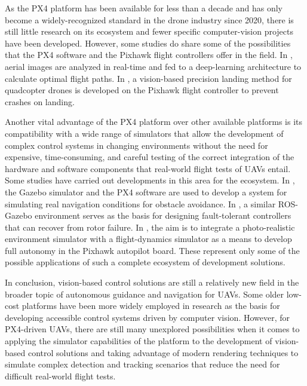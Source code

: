 As the PX4 platform has been available for less than a decade and has only become a widely-recognized standard in the drone industry since 2020, there is still little research on its ecosystem and fewer specific computer-vision projects have been developed.
However, some studies do share some of the possibilities that the PX4 software and the Pixhawk flight controllers offer in the field.
In \cite{sizkouhi2022}, aerial images are analyzed in real-time and fed to a deep-learning architecture to calculate optimal flight paths.
In \cite{naufal2022}, a vision-based precision landing method for quadcopter drones is developed on the Pixhawk flight controller to prevent crashes on landing.

Another vital advantage of the PX4 platform over other available platforms is its compatibility with a wide range of simulators that allow the development of complex control systems in changing environments without the need for expensive, time-consuming, and careful testing of the correct integration of the hardware and software components that real-world flight tests of UAVs entail.
Some studies have carried out developments in this area for the ecosystem.
In \cite{garcia2022}, the Gazebo simulator and the PX4 software are used to develop a system for simulating real navigation conditions for obstacle avoidance.
In \cite{chen2022}, a similar ROS-Gazebo environment serves as the basis for designing fault-tolerant controllers that can recover from rotor failure.
In \cite{huynh2022}, the aim is to integrate a photo-realistic environment simulator with a flight-dynamics simulator as a means to develop full autonomy in the Pixhawk autopilot board.
These represent only some of the possible applications of such a complete ecosystem of development solutions.

In conclusion, vision-based control solutions are still a relatively new field in the broader topic of autonomous guidance and navigation for UAVs.
Some older low-cost platforms have been more widely employed in research as the basis for developing accessible control systems driven by computer vision.
However, for PX4-driven UAVs, there are still many unexplored possibilities when it comes to applying the simulator capabilities of the platform to the development of vision-based control solutions and taking advantage of modern rendering techniques to simulate complex detection and tracking scenarios that reduce the need for difficult real-world flight tests.